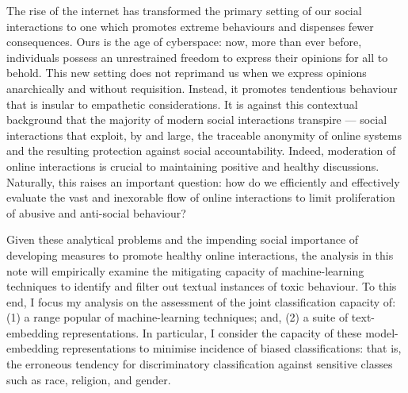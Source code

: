 
The rise of the internet has transformed the primary setting of our social interactions to one which promotes extreme behaviours and dispenses fewer consequences.
Ours is the age of cyberspace: now, more than ever before, individuals possess an unrestrained freedom to express their opinions for all to behold. 
This new setting does not reprimand us when we express opinions anarchically and without requisition.
Instead, it promotes tendentious behaviour that is insular to empathetic considerations.
It is against this contextual background that the majority of modern social interactions transpire --- social interactions that exploit, by and large, the traceable anonymity of online systems and the resulting protection against social accountability. 
Indeed, moderation of online interactions is crucial to maintaining positive and healthy discussions. 
Naturally, this raises an important question: how do we efficiently and effectively evaluate the vast and inexorable flow of online interactions to limit proliferation of abusive and anti-social behaviour?

Given these analytical problems and the impending social importance of developing measures to promote healthy online interactions, the analysis in this note will empirically examine the mitigating capacity of machine-learning techniques to identify and filter out textual instances of toxic behaviour.
To this end, I focus my analysis on the assessment of the joint classification capacity of: (1) a range popular of machine-learning techniques; and, (2) a suite of text-embedding representations. 
In particular, I consider the capacity of these model-embedding representations to minimise incidence of biased classifications: that is, the erroneous tendency for discriminatory classification against sensitive classes such as race, religion, and gender.




